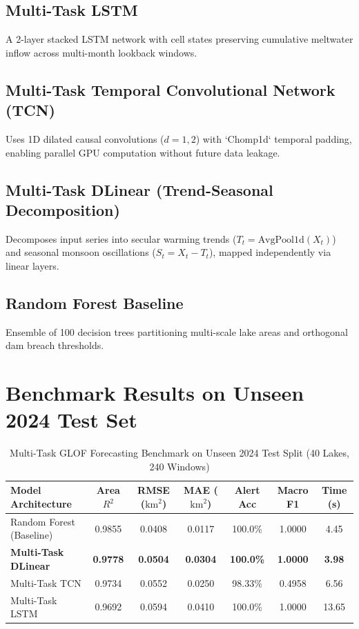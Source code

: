 \documentclass[12pt,a4paper]{report}
\begin{document}
\subsection{Multi-Task LSTM}
A 2-layer stacked LSTM network with cell states preserving cumulative meltwater inflow across multi-month lookback windows.

\subsection{Multi-Task Temporal Convolutional Network (TCN)}
Uses 1D dilated causal convolutions ($d = 1, 2$) with `Chomp1d` temporal padding, enabling parallel GPU computation without future data leakage.

\subsection{Multi-Task DLinear (Trend-Seasonal Decomposition)}
Decomposes input series into secular warming trends ($T_t = \text{AvgPool1d}(X_t)$) and seasonal monsoon oscillations ($S_t = X_t - T_t$), mapped independently via linear layers.

\subsection{Random Forest Baseline}
Ensemble of 100 decision trees partitioning multi-scale lake areas and orthogonal dam breach thresholds.

\section{Benchmark Results on Unseen 2024 Test Set}
\begin{table}[H]
\centering
\caption{Multi-Task GLOF Forecasting Benchmark on Unseen 2024 Test Split (40 Lakes, 240 Windows)}
\label{tab:glof_benchmark_results}
\begin{tabular}{lcccccc}
\toprule
\textbf{Model Architecture} & \textbf{Area $R^2$} & \textbf{RMSE ($\text{km}^2$)} & \textbf{MAE ($\text{km}^2$)} & \textbf{Alert Acc} & \textbf{Macro F1} & \textbf{Time (s)} \\
\midrule
Random Forest (Baseline) & 0.9855 & 0.0408 & 0.0117 & 100.0\% & 1.0000 & 4.45 \\
\textbf{Multi-Task DLinear} & \textbf{0.9778} & \textbf{0.0504} & \textbf{0.0304} & \textbf{100.0\%} & \textbf{1.0000} & \textbf{3.98} \\
Multi-Task TCN & 0.9734 & 0.0552 & 0.0250 & 98.33\% & 0.4958 & 6.56 \\
Multi-Task LSTM & 0.9692 & 0.0594 & 0.0410 & 100.0\% & 1.0000 & 13.65 \\
\bottomrule
\end{tabular}
\end{table}
\end{document}
